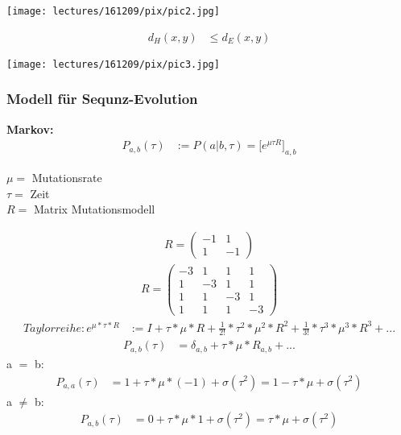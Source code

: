 \begin{center}
	\texttt{[image: lectures/161209/pix/pic2.jpg]}		
\end{center}

\begin{align*}
	d_H (x,y) &\leq d_E (x,y)
\end{align*}

\begin{center}
	\texttt{[image: lectures/161209/pix/pic3.jpg]}
\end{center}

\newpage	

\subsubsection{Modell für Sequnz-Evolution}
\textbf{Markov:}
\begin{align*}
	P_{a,b}(\tau) &:= P(a | b, \tau) = \biggl[e^{\mu \tau R} \biggr]_{a,b}
\end{align*}

$\mu = $ Mutationsrate\\
$\tau = $ Zeit\\
$R = $ Matrix Mutationsmodell

\begin{align*}
	R = \begin{pmatrix}
		-1 & 1\\
		 1 &-1
	\end{pmatrix}
\end{align*}
\begin{align*}
	R = \begin{pmatrix}
		-3 & 1 & 1 & 1\\
		 1 &-3 & 1 & 1\\
		 1 & 1 &-3 & 1\\
		 1 & 1 & 1 &-3
	\end{pmatrix}
\end{align*}
\begin{align*}
	Taylorreihe: e^{\mu * \tau * R} &:= I + \tau * \mu * R + \frac{1}{2!} * \tau^2 * \mu^2 * R^2 + \frac{1}{3!} * \tau^3 * \mu^3 * R^3 + ...
\end{align*}
\begin{align*}
	P_{a,b}(\tau) &= \delta_{a,b} + \tau * \mu * R_{a,b} + ...
\end{align*}
a $=$ b:
\begin{align*}
	P_{a,a}(\tau) &= 1 + \tau * \mu * (-1) + \sigma (\tau ^2) = 1 - \tau * \mu + \sigma (\tau ^2)
\end{align*}
a $\neq$ b:
\begin{align*}
	P_{a,b}(\tau) &= 0 + \tau * \mu * 1 + \sigma (\tau ^2) = \tau * \mu + \sigma (\tau ^2)
\end{align*}

